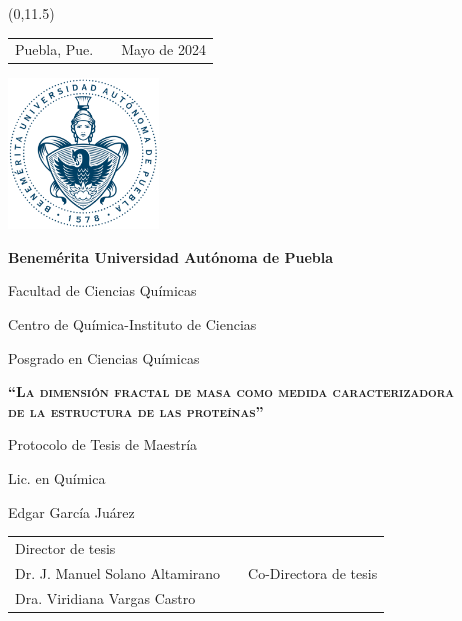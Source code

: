 \documentclass[11pt]{article}
\begin{document}
\begin{titlepage}

\begin{textblock}{3}(0,11.5)
   \begin{tabular}{ccc}
      Puebla, Pue. & \phantom{MMMMMMMMMMMMMMMMM} & Mayo de 2024\phantom{MMMMMM}
   \end{tabular}
\end{textblock}

\centering
\phantom{M}

\vspace{-20mm}
{\includegraphics[width=4cm]{buap} \par}
\vspace{5mm}
{\bfseries\huge Benemérita Universidad Autónoma de Puebla \par}
\vspace{10mm}
{\Large Facultad de Ciencias Químicas\par}
{\Large Centro de Química-Instituto de Ciencias \par}
\vspace{5mm}
{\Large Posgrado en Ciencias Químicas\par}
\vspace{15mm}
{\scshape\large \textbf{``La dimensi\'{o}n fractal de masa como medida caracterizadora\\de la estructura de las prote\'{i}nas''} \par}
\vspace{15mm}
{\large Protocolo de Tesis de Maestría\par}
\vspace{5mm}
{\Large Lic. en Qu\'{i}mica \par}
{\Large Edgar Garc\'{i}a Ju\'{a}rez \par}
\vspace{20mm}


\begin{tabular}{p{}cp{}}
  \cline{1-1} \cline{3-3} \\
  \centering Director de tesis \\ Dr. J. Manuel Solano Altamirano & & \centering Co-Directora de tesis\\ Dra. Viridiana Vargas Castro 
\end{tabular}

\end{titlepage}
\end{document}
